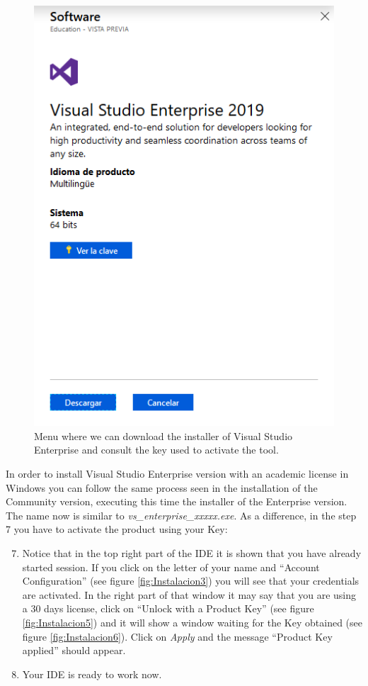 \begin{figure}
    \centering
    \includegraphics[width= 0.6 \textwidth]{Figures/ExtraE}
    \caption{Menu where we can download the installer of Visual Studio Enterprise and consult the key used to activate the tool.}
    \label{fig:ExtraE}
\end{figure}

In order to install Visual Studio Enterprise version with an academic license in Windows you can follow the same process seen in the installation of the Community version, executing this time the installer of the Enterprise version. The name now is similar to \textit{vs\_enterprise\_xxxxx.exe}. As a difference, in the step 7 you have to activate the product using your Key:

\begin{enumerate}
    \setcounter{enumi}{6}
    \item Notice that in the top right part of the IDE it is shown that you have already started session. If you click on the letter of your name and ``Account Configuration'' (see figure \ref{fig:Instalacion3}) you will see that your credentials are activated. In the right part of that window it may say that you are using a 30 days license, click on ``Unlock with a Product Key'' (see figure \ref{fig:Instalacion5}) and it will show a window waiting for the Key obtained (see figure \ref{fig:Instalacion6}). Click on \textit{Apply} and the message ``Product Key applied'' should appear. 
    \item Your IDE is ready to work now. 
\end{enumerate}

